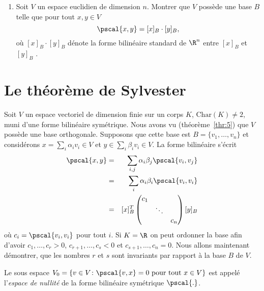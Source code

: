\begin{enumerate}
\item Soit $V$ un espace euclidien de dimension $n$. Montrer que $V$ possède une base $B$ telle que pour tout $x,y \in V$
  \begin{displaymath}
    \pscal{x,y} = [x]_B \cdot [y]_B, 
  \end{displaymath}
où $ [x]_B \cdot [y]_B$  dénote la forme bilinéaire standard de $\R^n$ entre $[x]_B$ et $ [y]_B$ .  

\end{enumerate}




\section{Le théorème de Sylvester}
\label{sec:le-theoreme-de}


Soit $V$ un espace vectoriel de dimension finie sur un corps $K$, $\mathrm{Char}(K) \neq 2$, muni d'une forme bilinéaire symétrique. Nous avons vu (théorème~\ref{thr:5}) que $V$ possède une base orthogonale. Supposons que cette base est $B = \{v_1,\dots,v_n\}$ et considérons $x = \sum_i \alpha_i v_i \in V$ et $y \in \sum_i \beta_i v_i \in V$. La forme bilinéaire  s'écrit 
\begin{eqnarray*}
  \pscal{x,y} & =  & \sum_{i, j} \alpha_i \beta_j \pscal{v_i,v_j} \\
              & = & \sum_i \alpha_i \beta_i \pscal{v_i,v_i} \\
               & = & [x]_B^T 
                    \begin{pmatrix}
                      c_1 & & \\
                                     & \ddots & \\
                                     & & c_n
                    \end{pmatrix} [y]_B
\end{eqnarray*}
où $c_i = \pscal{v_i,v_i}$ pour tout $i$. 
Si $K = \R$ on peut ordonner la base afin d'avoir $c_1,\dots,c_r>0$, $c_{r+1},\dots,c_s < 0$ et $c_{s+1},\dots,c_n = 0$. Nous allons maintenant démontrer, que les nombres $r$ et $s$ sont invariants par rapport à la base $B$ de $V$. 


\begin{definition}
  \label{def:11}
  Le sous espace $V_0 = \{v \in V \colon \pscal{v,x} = 0 \text{ pour tout } x \in V\}$ est appelé l'\emph{espace de nullité} de la forme bilinéaire symétrique $\pscal{.}$. 
\end{definition}

